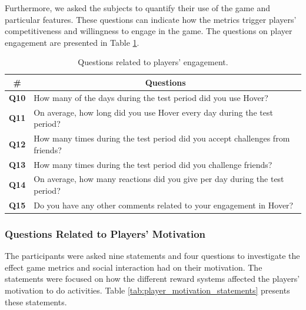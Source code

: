 Furthermore, we asked the subjects to quantify their use of the game and particular features. These questions can indicate how the metrics trigger players’ competitiveness and willingness to engage in the game. The questions on player engagement are presented in Table \ref{tab:player_engagement_questions}.

\begin{table}[H]
    \centering
    \begin{tabularx}{\textwidth}{|c|X|}
        \hline
        \textbf{\#} & \multicolumn{1}{c|}{\textbf{Questions}} \\ \hline
        \textbf{Q10} & How many of the days during the test period did you use Hover? \\
        \textbf{Q11} & On average, how long did you use Hover every day during the test period? \\
        \textbf{Q12} & How many times during the test period did you accept challenges from friends? \\
        \textbf{Q13} & How many times during the test period did you challenge friends? \\
        \textbf{Q14} & On average, how many reactions did you give per day during the test period? \\
        \textbf{Q15} & Do you have any other comments related to your engagement in Hover? \\ \hline
    \end{tabularx}
    \caption{Questions related to players' engagement.}
    \label{tab:player_engagement_questions}
\end{table}

\subsubsection{Questions Related to Players' Motivation}
The participants were asked nine statements and four questions to investigate the effect game metrics and social interaction had on their motivation. The statements were focused on how the different reward systems affected the players’ motivation to do activities. Table \ref{tab:player_motivation_statements} presents these statements.

